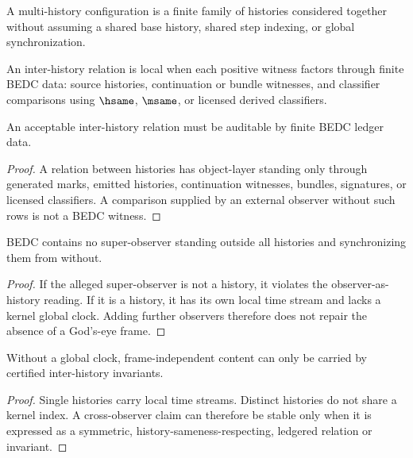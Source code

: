 \begin{definition}
\label{def:philosophy-multi-history-configuration}
A multi-history configuration is a finite family of histories considered
together without assuming a shared base history, shared step indexing,
or global synchronization.
\end{definition}

\begin{definition}
\label{def:philosophy-inter-history-locality}
An inter-history relation is local when each positive witness factors
through finite BEDC data: source histories, continuation or bundle
witnesses, and classifier comparisons using \(\hsame\), \(\msame\), or
licensed derived classifiers.
\end{definition}

\begin{theorem}
\label{thm:philosophy-inter-history-relations-ledger-visible}
An acceptable inter-history relation must be auditable by finite BEDC
ledger data.
\end{theorem}
\begin{proof}
A relation between histories has object-layer standing only through
generated marks, emitted histories, continuation witnesses, bundles,
signatures, or licensed classifiers. A comparison supplied by an
external observer without such rows is not a BEDC witness.
\end{proof}

\begin{corollary}
\label{cor:philosophy-no-observer-outside-all-observers}
BEDC contains no super-observer standing outside all histories and
synchronizing them from without.
\end{corollary}
\begin{proof}
If the alleged super-observer is not a history, it violates the
observer-as-history reading. If it is a history, it has its own local
time stream and lacks a kernel global clock. Adding further observers
therefore does not repair the absence of a God's-eye frame.
\end{proof}

\begin{corollary}
\label{cor:philosophy-frame-independent-content-inter-history-invariant}
Without a global clock, frame-independent content can only be carried by
certified inter-history invariants.
\end{corollary}
\begin{proof}
Single histories carry local time streams. Distinct histories do not
share a kernel index. A cross-observer claim can therefore be stable
only when it is expressed as a symmetric, history-sameness-respecting,
ledgered relation or invariant.
\end{proof}

